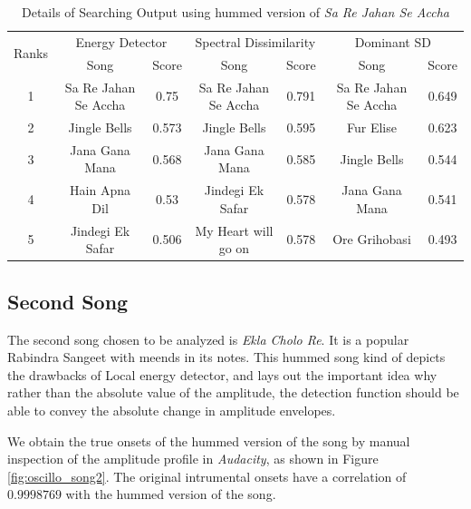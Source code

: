 \documentclass[10pt]{article}
\begin{document}
\begin{table}
\centering
\caption{Details of Searching Output using hummed version of \textit{Sa Re Jahan Se Accha}}
\label{tbl:search_song1}
\begin{tabular}{|c|c|c|c|c|c|c|}
\hline
\multirow{2}{*}{Ranks} & \multicolumn{2}{c|}{Energy Detector} & \multicolumn{2}{c|}{Spectral Dissimilarity} & \multicolumn{2}{c|}{Dominant SD} \\ \cline{2-7} 
                       & Song                     & Score     & Song                         & Score        & Song                   & Score   \\ \hline
1                      & Sa Re Jahan Se Accha     & 0.75      & Sa Re Jahan Se Accha         & 0.791        & Sa Re Jahan Se Accha   & 0.649   \\ \hline
2                      & Jingle Bells             & 0.573     & Jingle Bells                 & 0.595        & Fur Elise              & 0.623   \\ \hline
3                      & Jana Gana Mana           & 0.568     & Jana Gana Mana               & 0.585        & Jingle Bells           & 0.544   \\ \hline
4                      & Hain Apna Dil            & 0.53      & Jindegi Ek Safar             & 0.578        & Jana Gana Mana         & 0.541   \\ \hline
5                      & Jindegi Ek Safar         & 0.506     & My Heart will go on          & 0.578        & Ore Grihobasi          & 0.493   \\ \hline
\end{tabular}
\end{table}

\subsection{Second Song}
\qquad The second song chosen to be analyzed is \textit{Ekla Cholo Re}. It is a popular Rabindra Sangeet with meends in its notes. This hummed song kind of depicts the drawbacks of Local energy detector, and lays out the important idea why rather than the absolute value of the amplitude, the detection function should be able to convey the absolute change in amplitude envelopes.

We obtain the true onsets of the hummed version of the song by manual inspection of the amplitude profile in \textit{Audacity}, as shown in Figure \ref{fig:oscillo_song2}. The original intrumental onsets have a correlation of $0.9998769$ with the hummed version of the song.
\end{document}
